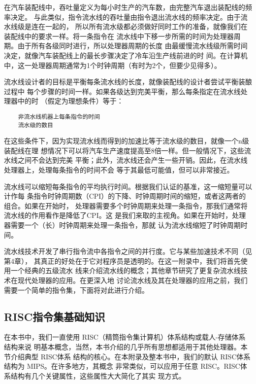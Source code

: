 在汽车装配线中，吞吐量定义为每小时生产的汽车数，由完整汽车退出装配线的频率决定。
与此类似，指令流水线的吞吐量由指令退出流水线的频率决定。由于流水线级是连在一起的，
所以所有流水级都必须做好同时工作的准备，就像我们在装配线中的要求一样。将一条指令在
流水线中下移一步所需的时间为处理器周期。由于所有各级同时进行，所以处理器周期的长度
由最缓慢流水线级所需时间决定，就像汽车装配线上的最长步骤决定了冷车沿生产线前进的时
间。在计算机中，这一处理器周期通常为1个时钟周期（有时为2个，但要少见得多）。

流水线设计者的目标是平衡每条流水线的长度，就像装配线的设计者尝试平衡装酿过程中
每个步骤的时间一样。如果各级达到完美平衡，那么每条指定在流水线处理器中的时
（假定为理想条件）等于：

\begin{verbatim}
    非流水线机器上每条指令的时间
    流水级的数目
\end{verbatim}

在这些条件下，因为实现流水线而得到的加速比等于流水级的数目，就像一个n级装配线在理
想情况下可以将汽车生产速度提高至8倍一样。但一般情况下，这些流水线之间不会达到完美
平衡；此外，流水线还会产生一些开销。因此，在流水线处理器上，处理每条指令的时间不会
等于其最低可能值，但可以非常接近。

流水线可以缩短每条指令的平均执行时间。根据我们认证的基准，这一缩短量可以计作每
条指令时钟周期数（CPI）的下降、时钟周期时间的缩短，或者这两者的组合。如果在开始时，
处理器需要多个时钟周期来处理一条指令，那我们通常将流水线的作用看作是降低了CPI。这
是我们来取的主视角。如果在开始时，处理器需要一个（长）时钟周期来处理一条指令，那就
认为流水线缩短了时钟周期时间。

流水线技术开发了串行指令流中各指令之间的并行度。它与某些加速技术不同（见第4章），
其真正的好处在于它对程序员是透明的。在这一附录中，我们将首先使用一个经典的五级流水
线来介绍流水线的概念；其他章节研究了更复杂流水线技术在现代处理器的应用。在更深入地
讨论流水线及其在处理器的应用之前，我们需要一个简单的指令集，下面将对此进行介绍。

\subsection{RISC指令集基础知识}
在本书中，我们一直使用 RISC（精筒指令集计算机）体系结构或载人-存储体系结构来说
明基本概念，当然，本书介绍的几乎所有思想都适用于其他处理器。本节介绍典型 RISC体系
结构的核心。在本附录及整本书中，我们的默认 RISC体系结构为 MIPS。在许多地方，其概念
非常类似，可以应用于任意 RISC。RISC体系结构有几个关键属性，这些属性大大简化了其实
现方式。


